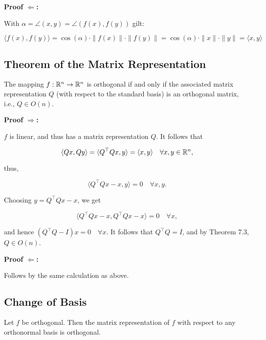 \QED
\vspace{\baselineskip}

\textbf{Proof \(\Leftarrow\):} 

With \(\alpha = \angle(x, y) = \angle(f(x), f(y))\) gilt:

\[
    \langle f(x), f(y) \rangle = \cos(\alpha) \cdot \|f(x)\| \cdot \|f(y)\| = \cos(\alpha) 
    \cdot \|x\| \cdot \|y\| = \langle x, y \rangle
\]

\QED

\subsection{Theorem of the Matrix Representation}

The mapping \( f : \mathbb{R}^n \to \mathbb{R}^n \) is orthogonal if and only if  
the associated matrix representation \( Q \) (with respect to the standard basis) is an orthogonal matrix, i.e., \( Q \in O(n) \).
\vspace{\baselineskip}

\textbf{Proof \(\Rightarrow\):} 

\(f\) is linear, and thus has a matrix representation \( Q \). It follows that

\[
    \langle Qx, Qy \rangle = \langle Q^\top Qx, y \rangle = \langle x, y \rangle \quad \forall x, y 
    \in \mathbb{R}^n,
\]

thus,

\[
    \langle Q^\top Qx - x, y \rangle = 0 \quad \forall x, y.
\]

Choosing \( y = Q^\top Qx - x \), we get

\[
    \langle Q^\top Qx - x, Q^\top Qx - x \rangle = 0 \quad \forall x,
\]

and hence \( (Q^\top Q - I)x = 0 \quad \forall x \).  
It follows that \( Q^\top Q = I \), and by Theorem 7.3, \( Q \in O(n) \).

\QED
\vspace{\baselineskip}

\textbf{Proof \(\Leftarrow\):} 

Follows by the same calculation as above.

\QED

\subsection{Change of Basis}

Let \(f\) be orthogonal. Then the matrix representation of \(f\)  
with respect to any orthonormal basis is orthogonal.
\vspace{\baselineskip}

